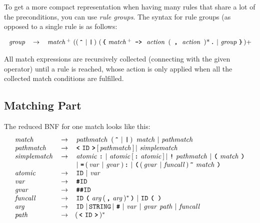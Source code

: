 \documentclass[11pt,a4paper]{article}
\begin{document}
To get a more compact representation when having many rules that share a lot
of the preconditions, you can use \emph{rule groups}. The syntax for rule groups
(as opposed to a single rule is as follows:

\[
\begin{array}{lcl}
\nt{group} & \rightarrow &
   \nt{match}^{+}\ ( (\tok{\^{}} \BAR  \tok{|})\ (\tok{\{}
 \nt{match}^{+}\mbox{\ \tok{->}\ }
    \mbox{\nt{action} ( \tok{,} \nt{action} )*} \tok{.} \BAR \nt{group} \tok{\}})+ \\
\end{array}
\]

All match expressions are recursively collected (connecting with the given
operator) until a rule is reached, whose action is only applied when all the
collected match conditions are fulfilled.

\subsection{Matching Part}
\label{matching_part}
The reduced BNF for one match looks like this:
\[
\begin{array}{lcl}
\nt{match} & \rightarrow &
  \nt{pathmatch}\ (\tok{\^{}} \BAR  \tok{|} )\  \nt{match} \BAR
  \nt{pathmatch}\\
\nt{pathmatch} & \rightarrow &
  \tok{<} \id \tok{>} [ \nt{pathmatch} ] \BAR \nt{simplematch}\\
\nt{simplematch} & \rightarrow &
  \nt{atomic} \tok{:} \BAR
  \nt{atomic} [ \tok{:} \nt{atomic} ] \BAR
  \tok{!} \nt{pathmatch} \BAR
  \tok{(} \nt{match} \tok{)}\\
& & \BAR \tok{=} ( \nt{var} \BAR \nt{gvar} ) \tok{:} \BAR
    \tok{(} ( \nt{gvar} \BAR \nt{funcall} ) \tok{\~} \nt{match} \tok{)}\\
\nt{atomic} & \rightarrow & \id \BAR \nt{var}\\
\nt{var} & \rightarrow & \tok{\#}\!\!\id \\
\nt{gvar}  & \rightarrow & \tok{\#\#}\!\!\id \\
\nt{funcall} & \rightarrow &
  \id \tok{(} \nt{arg} (\tok{,} \nt{arg})^{*} \tok{)} \BAR
  \id \tok{( )} \\
\nt{arg} & \rightarrow &
  \id \BAR \mbox{\texttt{STRING}} \BAR \tok{\#} \BAR \nt{var}
  \BAR \nt{gvar} \nt{path} \BAR \nt{funcall}\\
\nt{path} & \rightarrow & (\tok{<} \id \tok{>})^{*}\\
\end{array}
\]
\end{document}
